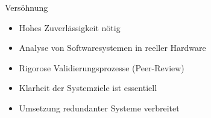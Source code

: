 \begin{frame}[T]{Versöhnung} %
  \begin{itemize}
    \item Hohes Zuverlässigkeit nötig
    \item Analyse von Softwaresystemen in reeller Hardware
    \item Rigorose Validierungsprozesse (Peer-Review)
    \item Klarheit der Systemziele ist essentiell
    \item Umsetzung redundanter Systeme verbreitet
  \end{itemize}
\end{frame}
